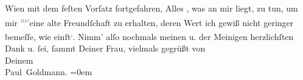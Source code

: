 \begin{ledgroupsized}[t]{13cm}
                  Wien mit dem feſten Vorſatz fortgefahren, Alles
                  , was an mir liegt, zu tun, um mir \substVorne{}\textsuperscript{\textcolor{gray}{me}}\substDazwischen{}eine\substHinten{} alte Freundſchaft zu erhalten, deren Wert ich gewiß nicht geringer bemeſſe,
               wie einſt\substVorne{}\textsuperscript{,}\substDazwischen{}.\substHinten{}\pend
           \pstart
           Nimm’ alſo nochmals meinen u. der Meinigen herzlichſten Dank u. ſei, ſammt
               Deiner Frau, vielmals gegrüßt
               von {\\[\baselineskip]}Deinem {\\[\baselineskip]}\spacefill\mbox{Paul Goldmann.}\pend
           \leftskip=0em{}
         
         \endnumbering{}\end{ledgroupsized}  \newcommand{\dateiname}{L03254}\newcommand{\titel}{Paul Goldmann an Arthur Schnitzler, 7. 7. 1907}\newcommand{\editorInnen}{Martin Anton Müller und Laura Untner}
      